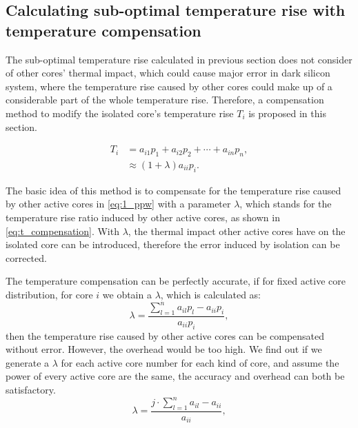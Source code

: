 \subsection{Calculating sub-optimal temperature rise with temperature compensation}
The sub-optimal temperature rise calculated in previous section does not consider of other cores' thermal impact, which could cause major error in dark silicon system, where the temperature rise caused by other cores could make up of a considerable part of the whole temperature rise. Therefore, a compensation method to modify the isolated core's temperature rise $T_{i}$ is proposed in this section.

\begin{equation}\label{eq:t_compensation}
\begin{split}
T_{i} &=a_{i1}p_{1} + a_{i2}p_{2} +\cdots + a_{in}p_{n},\\
&\approx(1+\lambda)a_{ii}p_{i}.
\end{split}
\end{equation}

The basic idea of this method is to compensate for the temperature rise caused by other active cores in \eqref{eq:1_ppw} with a parameter $\lambda$, which stands for the temperature rise ratio induced by other active cores, as shown in \eqref{eq:t_compensation}. With $\lambda$, the thermal impact other active cores have on the isolated core can be introduced, therefore the error induced by isolation can be corrected.

The temperature compensation can be perfectly accurate, if for fixed active core distribution, for core $i$ we obtain a $\lambda$, which is calculated as:
\begin{equation}\label{eq:lambda_accuracy}
\lambda =\frac{\sum_{l=1}^{n}a_{il}p_{l}-a_{ii}p_{i}}{a_{ii}p_{i}},
\end{equation}
then the temperature rise caused by other active cores can be compensated without error. However, the overhead would be too high. We find out if we generate a $\lambda$ for each active core number for each kind of core, and assume the power of every active core are the same, the accuracy and overhead can both be satisfactory.
\begin{equation}\label{eq:lambda}
\lambda =\frac{j \cdot \sum_{l=1}^{n}a_{il}-a_{ii}}{a_{ii}},
\end{equation}





